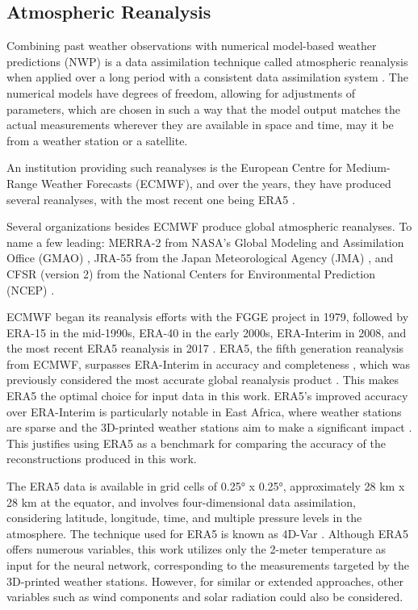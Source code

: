 \newpage

\subsection{Atmospheric Reanalysis}

Combining past weather observations with numerical model-based weather predictions (NWP)
is a data assimilation technique called atmospheric reanalysis when applied over a long period with a consistent data assimilation system \cite{Poli2016ERA20C, ECMWF2020dataassimilation}. The numerical models have degrees of freedom, allowing for adjustments of parameters, which are chosen in such a way that the model output matches the actual measurements wherever they are available in space and time, may it be from a weather station or a satellite.

An institution providing such reanalyses is the European Centre for Medium-Range Weather Forecasts (ECMWF), and over the years, they have produced several reanalyses, with the most recent one being ERA5 \cite{Hersbach2020ERA5quality}.

Several organizations besides ECMWF produce global atmospheric reanalyses. To name a few leading: MERRA-2 from NASA's Global Modeling and Assimilation Office (GMAO) \cite{Gelaro2017}, JRA-55 from the Japan Meteorological Agency (JMA) \cite{Kobayashi2015}, and CFSR (version 2) from the National Centers for Environmental Prediction (NCEP) \cite{Saha2014}.

ECMWF began its reanalysis efforts with the FGGE project in 1979, followed by ERA-15 in the mid-1990s, ERA-40 in the early 2000s, ERA-Interim in 2008, and the most recent ERA5 reanalysis in 2017 \cite{Hersbach2020ERA5quality}. ERA5, the fifth generation reanalysis from ECMWF, surpasses ERA-Interim in accuracy and completeness \cite{Hersbach2020ERA5quality}, which was previously considered the most accurate global reanalysis product \cite{Beck2019interimWasBest}. This makes ERA5 the optimal choice for input data in this work. ERA5's improved accuracy over ERA-Interim is particularly notable in East Africa, where weather stations are sparse and the 3D-printed weather stations aim to make a significant impact \cite{Gleixner2020ERA5africa}. This justifies using ERA5 as a benchmark for comparing the accuracy of the reconstructions produced in this work.

The ERA5 data is available in grid cells of 0.25° x 0.25°, approximately 28 km x 28 km at the equator, and involves four-dimensional data assimilation, considering latitude, longitude, time, and multiple pressure levels in the atmosphere. The technique used for ERA5 is known as 4D-Var \cite{era5}. Although ERA5 offers numerous variables, this work utilizes only the 2-meter temperature as input for the neural network, corresponding to the measurements targeted by the 3D-printed weather stations. However, for similar or extended approaches, other variables such as wind components and solar radiation could also be considered.